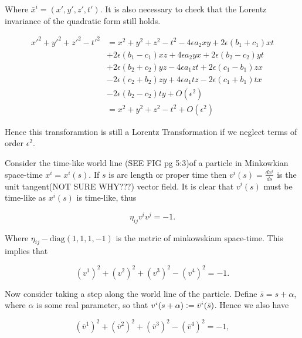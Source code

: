 \noindent Where $\bar{x}^i = (x',y',z',t')$. It is also necessary to check that the Lorentz invariance of the quadratic form still holds. 

\begin{eqnarray*}
{x'}^2 + {y'}^2 + {z'}^2 - {t'}^2 & = x^2 + y^2 + z^2 - t^2 - 4\epsilon a_2 x y + 2 \epsilon(b_1 + c_1)xt \\
                                  & + 2\epsilon (b_1 - c_1)xz + 4 \epsilon a_2 yx + 2\epsilon (b_2 - c_2)yt \\
                                  & + 2 \epsilon (b_2 + c_2)yz - 4\epsilon a_1 zt + 2 \epsilon (c_1 - b_1)zx \\
                                  & -2 \epsilon (c_2 + b_2)zy + 4 \epsilon a_1 tz - 2 \epsilon (c_1 + b_1)tx \\
                                  & -2\epsilon (b_2 - c_2) ty + O(\epsilon^2) \\
                                  & = x^2 + y^2 + z^2 - t^2 + O(\epsilon^2)
\end{eqnarray*}

\noindent Hence this transforamtion is still a Lorentz Transformation if we neglect terms of order $\epsilon^2$.

Consider the time-like world line (SEE FIG pg 5:3)of a particle in Minkowkian space-time $x^i = x^i(s)$. If $s$ is arc length or proper time then $v^i(s) = \frac{dx^i}{ds}$ is the unit tangent(NOT SURE WHY???) vector field. It is clear that $v^i(s)$ must be time-like as $x^i(s)$ is time-like, thus

\begin{equation*}
\eta_{ij} v^i v^j = -1. 
\end{equation*}

\noindent Where $\eta_{ij} - \text{diag}(1,1,1,-1)$ is the metric of minkowskiam space-time. This implies that 

\begin{equation*}
(v^1)^2  + (v^2)^2 + (v^3)^2  - (v^4)^2 = -1.
\end{equation*}

Now consider taking a step along the world line of the particle. Define $\bar{s} = s + \alpha$, where $\alpha$ is some real parameter, so that $v^i (s+\alpha) \vcentcolon = \bar{v}^i(\bar{s})$. Hence we also have

\begin{equation*}
({\bar{v}^1})^2  + ({\bar{v}^2})^2 + ({\bar{v}^3})^2  - ({\bar{v}^4})^2 = -1,
\end{equation*}

